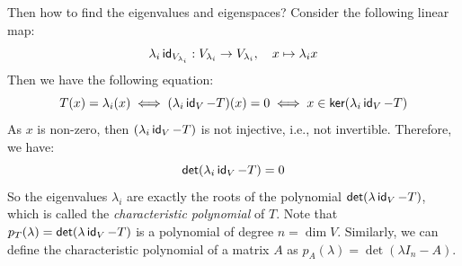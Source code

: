 Then how to find the eigenvalues and eigenspaces? Consider the following linear map:
\[
  \lambda_i \id_{V_{\lambda_i}} : V_{\lambda_i} \to V_{\lambda_i}, \quad x \mapsto \lambda_i x
\]
Then we have the following equation:
\[
  T(x) = \lambda_i(x) \iff (\lambda_i \id_V - T)(x) = 0 \iff x \in \ker(\lambda_i \id_V - T)
\]
As $x$ is non-zero, then $(\lambda_i \id_V - T)$ is not injective, i.e., not invertible. Therefore, we have:
\[
  \det (\lambda_i \id_V - T) = 0
\]
So the eigenvalues $\lambda_i$ are exactly the roots of the polynomial $\det (\lambda \id_V - T)$, which is called the \emph{characteristic polynomial} of $T$. Note that $p_T (\lambda) = \det (\lambda \id_V - T)$ is a polynomial of degree $n = \dim V$. Similarly, we can define the characteristic polynomial of a matrix $A$ as $p_A (\lambda) = \det (\lambda I_n - A)$.

